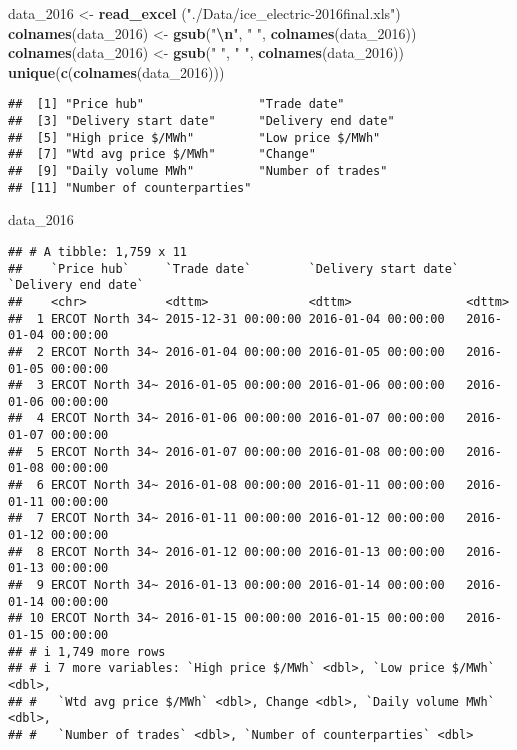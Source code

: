 \documentclass[
]{article}
\newenvironment{Shaded}{\begin{snugshade}}{\end{snugshade}}
\newcommand{\FunctionTok}[1]{\textcolor[rgb]{0.13,0.29,0.53}{\textbf{#1}}}
\newcommand{\NormalTok}[1]{#1}
\newcommand{\OtherTok}[1]{\textcolor[rgb]{0.56,0.35,0.01}{#1}}
\newcommand{\SpecialCharTok}[1]{\textcolor[rgb]{0.81,0.36,0.00}{\textbf{#1}}}
\newcommand{\StringTok}[1]{\textcolor[rgb]{0.31,0.60,0.02}{#1}}
\begin{document}
\begin{Shaded}
\begin{Highlighting}[]
\NormalTok{data\_2016 }\OtherTok{\textless{}{-}} \FunctionTok{read\_excel}\NormalTok{ (}\StringTok{"./Data/ice\_electric{-}2016final.xls"}\NormalTok{)}
\FunctionTok{colnames}\NormalTok{(data\_2016) }\OtherTok{\textless{}{-}} \FunctionTok{gsub}\NormalTok{(}\StringTok{"}\SpecialCharTok{\textbackslash{}n}\StringTok{"}\NormalTok{, }\StringTok{" "}\NormalTok{, }\FunctionTok{colnames}\NormalTok{(data\_2016))}
\FunctionTok{colnames}\NormalTok{(data\_2016) }\OtherTok{\textless{}{-}} \FunctionTok{gsub}\NormalTok{(}\StringTok{"  "}\NormalTok{, }\StringTok{" "}\NormalTok{, }\FunctionTok{colnames}\NormalTok{(data\_2016))}
\FunctionTok{unique}\NormalTok{(}\FunctionTok{c}\NormalTok{(}\FunctionTok{colnames}\NormalTok{(data\_2016)))}
\end{Highlighting}
\end{Shaded}

\begin{verbatim}
##  [1] "Price hub"                "Trade date"              
##  [3] "Delivery start date"      "Delivery end date"       
##  [5] "High price $/MWh"         "Low price $/MWh"         
##  [7] "Wtd avg price $/MWh"      "Change"                  
##  [9] "Daily volume MWh"         "Number of trades"        
## [11] "Number of counterparties"
\end{verbatim}

\begin{Shaded}
\begin{Highlighting}[]
\NormalTok{data\_2016}
\end{Highlighting}
\end{Shaded}

\begin{verbatim}
## # A tibble: 1,759 x 11
##    `Price hub`     `Trade date`        `Delivery start date` `Delivery end date`
##    <chr>           <dttm>              <dttm>                <dttm>             
##  1 ERCOT North 34~ 2015-12-31 00:00:00 2016-01-04 00:00:00   2016-01-04 00:00:00
##  2 ERCOT North 34~ 2016-01-04 00:00:00 2016-01-05 00:00:00   2016-01-05 00:00:00
##  3 ERCOT North 34~ 2016-01-05 00:00:00 2016-01-06 00:00:00   2016-01-06 00:00:00
##  4 ERCOT North 34~ 2016-01-06 00:00:00 2016-01-07 00:00:00   2016-01-07 00:00:00
##  5 ERCOT North 34~ 2016-01-07 00:00:00 2016-01-08 00:00:00   2016-01-08 00:00:00
##  6 ERCOT North 34~ 2016-01-08 00:00:00 2016-01-11 00:00:00   2016-01-11 00:00:00
##  7 ERCOT North 34~ 2016-01-11 00:00:00 2016-01-12 00:00:00   2016-01-12 00:00:00
##  8 ERCOT North 34~ 2016-01-12 00:00:00 2016-01-13 00:00:00   2016-01-13 00:00:00
##  9 ERCOT North 34~ 2016-01-13 00:00:00 2016-01-14 00:00:00   2016-01-14 00:00:00
## 10 ERCOT North 34~ 2016-01-15 00:00:00 2016-01-15 00:00:00   2016-01-15 00:00:00
## # i 1,749 more rows
## # i 7 more variables: `High price $/MWh` <dbl>, `Low price $/MWh` <dbl>,
## #   `Wtd avg price $/MWh` <dbl>, Change <dbl>, `Daily volume MWh` <dbl>,
## #   `Number of trades` <dbl>, `Number of counterparties` <dbl>
\end{verbatim}
\end{document}
